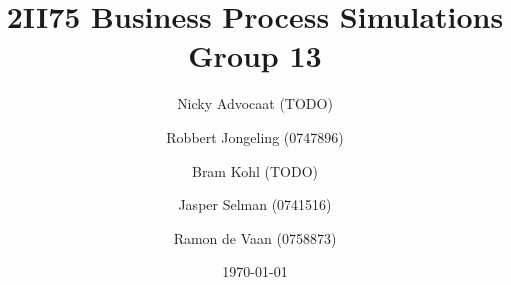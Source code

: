 \documentclass[a4paper,11pt]{article}
\title{
	2II75 Business Process Simulations \\
	\small{Group 13}
}
\author{
	Nicky Advocaat (TODO)
	\and
	Robbert Jongeling (0747896)
	\and
	Bram Kohl (TODO)
	\and
	Jasper Selman (0741516)
	\and
	Ramon de Vaan (0758873)
}
\date{\today}
\begin{document}
	\maketitle
	
	
		
	\newpage
	\begin{appendix}
	
	\end{appendix}
\end{document}
